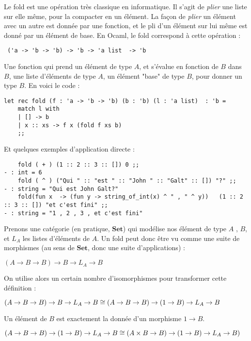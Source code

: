 \documentclass{article}
\begin{document}
Le fold est une opération très classique en informatique. Il s'agit de \textit{plier} une liste sur elle même, pour la compacter en un élément. La façon de \textit{plier} un élément avec un autre est donnée par une fonction, et le pli d'un élément sur lui même est donné par un élément de base. En Ocaml, le fold correspond à cette opération :

\begin{lstlisting}
 ('a -> 'b -> 'b) -> 'b -> 'a list  -> 'b
\end{lstlisting}
 
Une fonction qui prend un élément de type $A$, et s'évalue en fonction de $B$ dans $B$, une liste d'éléments de type $A$,   un élément "base" de type $B$,  pour donner un type $B$. En voici le code :

\begin{lstlisting}
let rec fold (f : 'a -> 'b -> 'b) (b : 'b) (l : 'a list)  : 'b = 
    match l with 
    | [] -> b
    | x :: xs -> f x (fold f xs b)
    ;;           
\end{lstlisting}

Et quelques exemples d'application directe :

\begin{lstlisting}
    fold ( + ) (1 :: 2 :: 3 :: []) 0 ;; 
- : int = 6 
    fold ( ^ ) ("Qui " :: "est " :: "John " :: "Galt" :: []) "?" ;; 
- : string = "Qui est John Galt?"
    fold(fun x  -> (fun y -> string_of_int(x) ^ " , " ^ y))   (1 :: 2 :: 3 :: []) "et c'est fini" ;; 
- : string = "1 , 2 , 3 , et c'est fini"
\end{lstlisting}

Prenons une catégorie (en pratique, $\mathbf{Set}$) qui modélise nos élément de type $A$ , $B$, et $L_A$ les listes d'éléments de $A$. Un fold peut donc être vu comme une suite de morphismes (au sens de $\mathbf{Set}$, donc une suite d'applications) : 
\begin{center}
$ 
(A \rightarrow B \rightarrow B) \rightarrow B \rightarrow L_A \rightarrow B 
$    
\end{center}

On utilise alors un certain nombre d'isomorphismes pour transformer cette définition : 
\begin{center}
 
$(A \rightarrow B \rightarrow B) \rightarrow B \rightarrow L_A \rightarrow B \cong \\ 
(A \rightarrow B \rightarrow B)  \rightarrow (1 \rightarrow B)   \rightarrow L_A \rightarrow B
$
    
\end{center}
Un élément de $B$ est exactement la donnée d'un morphisme $1 \rightarrow B$.
\begin{center}
    
$ (A \rightarrow B \rightarrow B)  \rightarrow (1 \rightarrow B)   \rightarrow L_A \rightarrow B \cong \\ 
(A \times B \rightarrow B) \rightarrow (1 \rightarrow B) \rightarrow L_A \rightarrow B)
$
\end{center}
\end{document}
